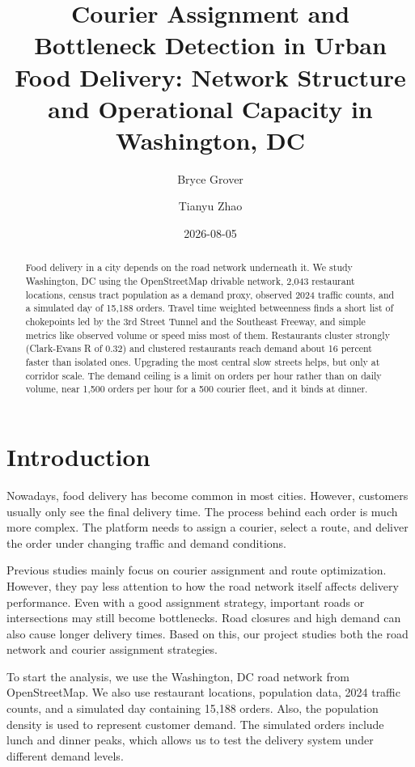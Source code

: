 \documentclass[
  11pt,
]{article}
\title{Courier Assignment and Bottleneck Detection in Urban Food
Delivery: Network Structure and Operational Capacity in Washington, DC}
\author{Bryce Grover \and Tianyu Zhao}
\date{2026-08-05}
\begin{document}
\maketitle
\begin{abstract}
Food delivery in a city depends on the road network underneath it. We
study Washington, DC using the OpenStreetMap drivable network, 2,043
restaurant locations, census tract population as a demand proxy,
observed 2024 traffic counts, and a simulated day of 15,188 orders.
Travel time weighted betweenness finds a short list of chokepoints led
by the 3rd Street Tunnel and the Southeast Freeway, and simple metrics
like observed volume or speed miss most of them. Restaurants cluster
strongly (Clark-Evans R of 0.32) and clustered restaurants reach demand
about 16 percent faster than isolated ones. Upgrading the most central
slow streets helps, but only at corridor scale. The demand ceiling is a
limit on orders per hour rather than on daily volume, near 1,500 orders
per hour for a 500 courier fleet, and it binds at dinner.
\end{abstract}


\section{Introduction}\label{introduction}

Nowadays, food delivery has become common in most cities. However,
customers usually only see the final delivery time. The process behind
each order is much more complex. The platform needs to assign a courier,
select a route, and deliver the order under changing traffic and demand
conditions.

Previous studies mainly focus on courier assignment and route
optimization. However, they pay less attention to how the road network
itself affects delivery performance. Even with a good assignment
strategy, important roads or intersections may still become bottlenecks.
Road closures and high demand can also cause longer delivery times.
Based on this, our project studies both the road network and courier
assignment strategies.

To start the analysis, we use the Washington, DC road network from
OpenStreetMap. We also use restaurant locations, population data, 2024
traffic counts, and a simulated day containing 15,188 orders. Also, the
population density is used to represent customer demand. The simulated
orders include lunch and dinner peaks, which allows us to test the
delivery system under different demand levels.
\end{document}

